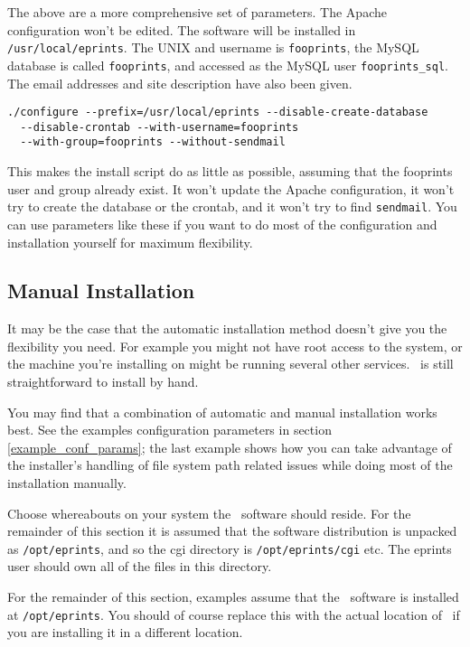The above are a more comprehensive set of parameters. The Apache configuration won't be edited. The software will be installed in {\tt /usr/local/eprints}. The UNIX and username is {\tt fooprints}, the MySQL database is called {\tt fooprints}, and accessed as the MySQL user {\tt fooprints\_sql}. The email addresses and site description have also been given.

\begin{verbatim}
./configure --prefix=/usr/local/eprints --disable-create-database
  --disable-crontab --with-username=fooprints
  --with-group=fooprints --without-sendmail
\end{verbatim}

This makes the install script do as little as possible, assuming that the fooprints user and group already exist. It won't update the Apache configuration, it won't try to create the database or the crontab, and it won't try to find {\tt sendmail}. You can use parameters like these if you want to do most of the configuration and installation yourself for maximum flexibility.


\subsection{Manual Installation}
\label{install_manual}

It may be the case that the automatic installation method doesn't give you the flexibility you need. For example you might not have root access to the system, or the machine you're installing on might be running several other services. \eprints\ is still straightforward to install by hand.

You may find that a combination of automatic and manual installation works best. See the examples configuration parameters in section \ref{example_conf_params}; the last example shows how you can take advantage of the installer's handling of file system path related issues while doing most of the installation manually.

Choose whereabouts on your system the \eprints\ software should reside. For the remainder of this section it is assumed that the software distribution is unpacked as {\tt /opt/eprints}, and so the cgi directory is {\tt /opt/eprints/cgi} etc. The eprints user should own all of the files in this directory.

For the remainder of this section, examples assume that the \eprints\ software is installed at {\tt /opt/eprints}. You should of course replace this with the actual location of \eprints\ if you are installing it in a different location.

